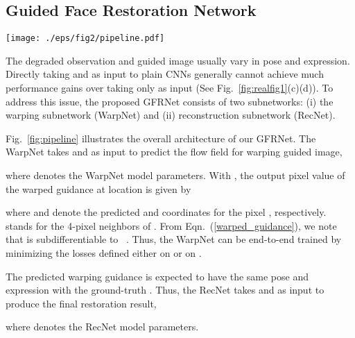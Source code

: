 \documentclass[runningheads]{llncs}
\begin{document}
\subsection{Guided Face Restoration Network}
\begin{figure*}[t]
\setlength{\abovecaptionskip}{-1ex}
\setlength{\belowcaptionskip}{-2ex}
\begin{center}
\texttt{[image: ./eps/fig2/pipeline.pdf]}
\end{center}
   \caption{Overview of our GFRNet. The WarpNet takes the degraded observation  and guided image  as input to predict the dense flow field , which is adopted to deform  to the warped guidance .  is expected to be spatially well aligned with ground-truth . Thus the RecNet takes  and  as input to produce the restoration result . }
   \label{fig:pipeline}
\end{figure*}
The degraded observation  and guided image  usually vary in pose and expression.
{Directly} taking  and  as input to plain CNNs generally cannot achieve much performance gains over taking only  as input (See Fig.~\ref{fig:realfig1}(c)(d)).
To address this issue, the proposed GFRNet consists of two subnetworks: (i) the warping subnetwork (WarpNet) and (ii) reconstruction subnetwork (RecNet).

Fig.~\ref{fig:pipeline} illustrates the overall architecture of our GFRNet.
The WarpNet takes  and  as input to predict the flow field for warping guided image,

where  denotes the WarpNet model parameters.
With , the output pixel value of the warped guidance  at location  is given by

where  and  denote the predicted  and  coordinates for the pixel , respectively.
 stands for the 4-pixel neighbors of .
From Eqn.~(\ref{warped_guidance}), we note that  is subdifferentiable to ~\cite{jaderberg2015spatial}.
Thus, the WarpNet can be end-to-end trained by minimizing the losses defined either on  or on .


The predicted warping guidance  is expected to have the same pose and expression with the ground-truth .
Thus, the RecNet takes  and  as input to produce the final restoration result,

where  denotes the RecNet model parameters.
\end{document}
